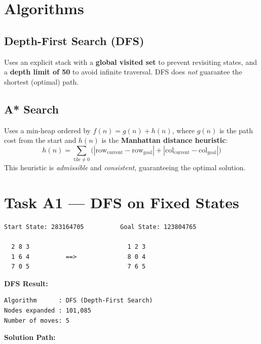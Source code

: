 \documentclass[12pt, a4paper]{article}
\begin{document}
\section{Algorithms}

\subsection{Depth-First Search (DFS)}
Uses an explicit stack with a \textbf{global visited set} to prevent revisiting states, and a \textbf{depth limit of 50} to avoid infinite traversal. DFS does \emph{not} guarantee the shortest (optimal) path.

\subsection{A* Search}
Uses a min-heap ordered by $f(n) = g(n) + h(n)$, where $g(n)$ is the path cost from the start and $h(n)$ is the \textbf{Manhattan distance heuristic}:
\[
  h(n) = \sum_{\text{tile} \neq 0} \bigl(|\text{row}_{\text{current}} - \text{row}_{\text{goal}}| + |\text{col}_{\text{current}} - \text{col}_{\text{goal}}|\bigr)
\]
This heuristic is \emph{admissible} and \emph{consistent}, guaranteeing the optimal solution.

\section{Task A1 --- DFS on Fixed States}

\begin{lstlisting}[style=mono]
Start State: 283164705          Goal State: 123804765

  2 8 3                           1 2 3
  1 6 4          ==>              8 0 4
  7 0 5                           7 6 5
\end{lstlisting}

\textbf{DFS Result:}
\begin{lstlisting}[style=mono]
Algorithm      : DFS (Depth-First Search)
Nodes expanded : 101,085
Number of moves: 5
\end{lstlisting}

\textbf{Solution Path:}
\end{document}
